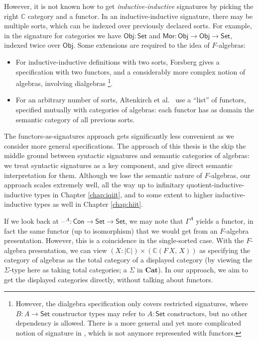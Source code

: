 \documentclass[12pt,a4paper,twoside,openany]{book}
\theoremstyle{remark}
\theoremstyle{definition}
\theoremstyle{theorem}
\newcommand{\ms}[1]{\mathsf{#1}}
\newcommand{\mbb}[1]{\mathbb{#1}}
\newcommand{\mbf}[1]{\mathbf{#1}}
\newcommand{\Con}{\mathsf{Con}}
\newcommand{\blank}{\mathord{\hspace{1pt}\text{--}\hspace{1pt}}}
\newcommand{\Set}{\mathsf{Set}}
\newcommand{\Mor}{\ms{Mor}}
\newcommand{\Obj}{\ms{Obj}}
\begin{document}
However, it is not known how to get \emph{inductive-inductive} signatures by
picking the right $\mbb{C}$ category and a functor. In an inductive-inductive
signature, there may be multiple sorts, which can be indexed over previously
declared sorts. For example, in the signature for categories we have $\Obj :
\Set$ and $\Mor : \Obj \to \Obj \to \Set$, indexed twice over $\Obj$. Some
extensions are required to the idea of $F$-algebras:
\begin{itemize}
\item
  For inductive-inductive definitions with two sorts, Forsberg gives a
  specification with two functors, and a considerably more complex notion of
  algebras, involving dialgebras \cite{forsberg-phd}\footnote{However, the
  dialgebra specification only covers restricted signatures, where $B : A \to
  \Set$ constructor types may refer to $A : \Set$ constructors, but no other
  dependency is allowed.  There is a more general and yet more complicated
  notion of signature in \cite{forsberg-phd}, which is not anymore represented
  with functors.}.
\item
  For an arbitrary number of sorts, Altenkirch et
  al.\ \cite{altenkirch18qiit} use a ``list'' of functors, specified mutually
  with categories of algebras: each functor has as domain the semantic category
  of all previous sorts.
\end{itemize}

The functors-as-signatures approach gets significantly less convenient as we
consider more general specifications. The approach of this thesis is the skip the
middle ground between syntactic signatures and semantic categories of algebras:
we treat syntactic signatures as a key component, and give direct semantic
interpretation for them. Although we lose the semantic nature of $F$-algebras,
our approach scales extremely well, all the way up to infinitary
quotient-inductive-inductive types in Chapter \ref{chap:iqiit}, and to some
extent to higher inductive-inductive types as well in Chapter \ref{chap:hiit}.

If we look back at $\blank^A : \Con \to \Set \to \Set$, we may note that
$\Gamma^A$ yields a functor, in fact the same functor (up to isomorphism) that
we would get from an $F$-algebra presentation. However, this is a coincidence in
the single-sorted case. With the $F$-algebra presentation, we can view $(X :
|\mbb{C}|) \times (\mbb{C}(F\,X,\,X))$ as specifying the category of algebras as
the total category of a displayed category (by viewing the $\Sigma$-type here as
taking total categories; a $\Sigma$ in $\mbf{Cat}$). In our approach, we aim to
get the displayed categories directly, without talking about functors.
\end{document}
